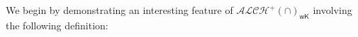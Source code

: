 \documentclass[letterpaper]{article} %
\theoremstyle{definition}
\newtheorem{lemma}{Lemma}
\theoremstyle{definition}
\theoremstyle{definition}
\theoremstyle{definition}
\theoremstyle{definition}
\begin{document}








We begin by demonstrating an interesting feature of $\mathcal{ALCH}^+(\cap)_{\mathsf{wK}}$ involving the following definition:
\end{document}
